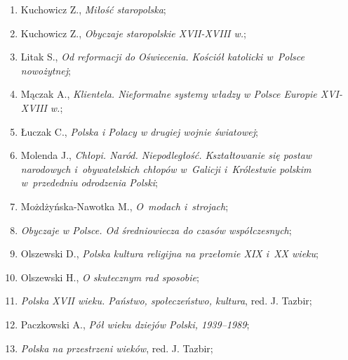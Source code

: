 \documentclass[a4paper,11pt]{article}
\begin{document}
\begin{enumerate}
\item Kuchowicz Z., \textit{Miłość staropolska};



\item Kuchowicz Z., \textit{Obyczaje staropolskie XVII-XVIII w.};



\item Litak S., \textit{Od reformacji do Oświecenia. Kościół katolicki
    w~Polsce nowożytnej};



\item Mączak A., \textit{Klientela. Nieformalne systemy władzy w Polsce
    Europie XVI-XVIII w.};



\item Łuczak C., \textit{Polska i Polacy w drugiej wojnie światowej};



\item Molenda J., \textit{Chłopi. Naród. Niepodległość. Kształtowanie
    się postaw narodowych i~obywatelskich chłopów w~Galicji
    i~Królestwie polskim w~przededniu odrodzenia Polski};



\item Możdżyńska-Nawotka M., \textit{O~modach i~strojach};



\item \textit{Obyczaje w Polsce. Od średniowiecza do czasów
    współczesnych};



\item Olszewski D., \textit{Polska kultura religijna na przełomie XIX
    i~XX wieku};



\item Olszewski H., \textit{O skutecznym rad sposobie};



\item \textit{Polska XVII wieku. Państwo, społeczeństwo, kultura}, red.
  J. Tazbir;



\item Paczkowski A., \textit{Pół wieku dziejów Polski, 1939--1989};



\item \textit{Polska na przestrzeni wieków}, red. J. Tazbir;




\end{enumerate}
\end{document}
